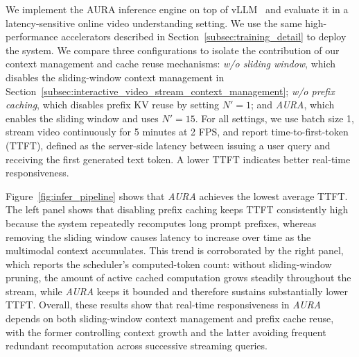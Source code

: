 We implement the AURA inference engine on top of vLLM~\citep{vllm} and evaluate it in a latency-sensitive online video understanding setting. We use the same high-performance accelerators described in Section~\ref{subsec:training_detail} to deploy the system. We compare three configurations to isolate the contribution of our context management and cache reuse mechanisms: \textit{w/o sliding window}, which disables the sliding-window context management in Section~\ref{subsec:interactive_video_stream_context_management}; \textit{w/o prefix caching}, which disables prefix KV reuse by setting $N' = 1$; and \textit{AURA}, which enables the sliding window and uses $N' = 15$. For all settings, we use batch size 1, stream video continuously for 5 minutes at 2 FPS, and report time-to-first-token (TTFT), defined as the server-side latency between issuing a user query and receiving the first generated text token. A lower TTFT indicates better real-time responsiveness.



Figure~\ref{fig:infer_pipeline} shows that \textit{AURA} achieves the lowest average TTFT. The left panel shows that disabling prefix caching keeps TTFT consistently high because the system repeatedly recomputes long prompt prefixes, whereas removing the sliding window causes latency to increase over time as the multimodal context accumulates. This trend is corroborated by the right panel, which reports the scheduler's computed-token count: without sliding-window pruning, the amount of active cached computation grows steadily throughout the stream, while \textit{AURA} keeps it bounded and therefore sustains substantially lower TTFT. Overall, these results show that real-time responsiveness in \textit{AURA} depends on both sliding-window context management and prefix cache reuse, with the former controlling context growth and the latter avoiding frequent redundant recomputation across successive streaming queries.



